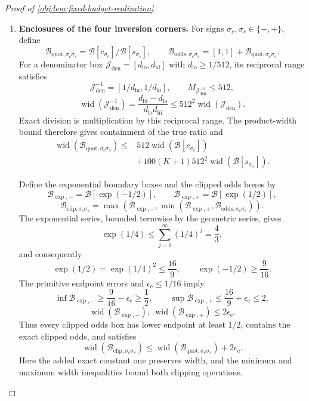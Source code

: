 \documentclass[11pt]{article}
\begin{document}
\begin{proof}[Proof of \cref{obj:lem:fixed-budget-realization}]
\begin{enumerate}
\item \textbf{Enclosures of the four inversion corners.}
For signs \(\sigma_c,\sigma_s\in\{-,+\}\), define
\[
\mathcal B_{\mathrm{quot},\sigma_c\sigma_s}
=\mathcal B[c_{\sigma_c}]/\mathcal B[s_{\sigma_s}],
\qquad
\mathcal B_{\mathrm{odds},\sigma_c\sigma_s}
=[1,1]+\mathcal B_{\mathrm{quot},\sigma_c\sigma_s}.
\]
For a denominator box
\(\mathcal J_{\mathrm{den}}=[d_{\mathrm{lo}},d_{\mathrm{hi}}]\)
with \(d_{\mathrm{lo}}\ge1/512\), its reciprocal range satisfies
\[
\mathcal J_{\mathrm{den}}^{-1}
=[1/d_{\mathrm{hi}},1/d_{\mathrm{lo}}],
\qquad
M_{\mathcal J_{\mathrm{den}}^{-1}}\le512,
\]
\[
\operatorname{wid}(\mathcal J_{\mathrm{den}}^{-1})
=
\frac{d_{\mathrm{hi}}-d_{\mathrm{lo}}}
     {d_{\mathrm{lo}}d_{\mathrm{hi}}}
\le512^2\operatorname{wid}(\mathcal J_{\mathrm{den}}).
\]
Exact division is multiplication by this reciprocal range. The product-width bound therefore gives containment of the true ratio and
\[
\begin{aligned}
\operatorname{wid}(\mathcal B_{\mathrm{quot},\sigma_c\sigma_s})
\le{}&
512\operatorname{wid}(\mathcal B[c_{\sigma_c}])\\
&+100(K+1)512^2
 \operatorname{wid}(\mathcal B[s_{\sigma_s}]).
\end{aligned}
\]

Define the exponential boundary boxes and the clipped odds boxes by
\[
\mathcal B_{\exp,-}=\mathcal B[\exp(-1/2)],
\qquad
\mathcal B_{\exp,+}=\mathcal B[\exp(1/2)],
\]
\[
\mathcal B_{\mathrm{clip},\sigma_c\sigma_s}
=
\max\left(
\mathcal B_{\exp,-},
\min\left(\mathcal B_{\exp,+},
          \mathcal B_{\mathrm{odds},\sigma_c\sigma_s}\right)
\right).
\]
The exponential series, bounded termwise by the geometric series, gives
\[
\exp(1/4)\le\sum_{j=0}^{\infty}(1/4)^j=\frac43,
\]
and consequently
\[
\exp(1/2)=\exp(1/4)^2\le\frac{16}{9},
\qquad
\exp(-1/2)\ge\frac9{16}.
\]
The primitive endpoint errors and \(\epsilon_{\mathrm e}\le1/16\) imply
\[
\inf\mathcal B_{\exp,-}\ge\frac9{16}-\epsilon_{\mathrm e}\ge\frac12,
\qquad
\sup\mathcal B_{\exp,+}\le\frac{16}{9}+\epsilon_{\mathrm e}\le2,
\]
\[
\operatorname{wid}(\mathcal B_{\exp,-}),
\ \operatorname{wid}(\mathcal B_{\exp,+})
\le2\epsilon_{\mathrm e}.
\]
Thus every clipped odds box has lower endpoint at least \(1/2\), contains the exact clipped odds, and satisfies
\[
\operatorname{wid}(\mathcal B_{\mathrm{clip},\sigma_c\sigma_s})
\le
\operatorname{wid}(\mathcal B_{\mathrm{quot},\sigma_c\sigma_s})
+2\epsilon_{\mathrm e}.
\]
Here the added exact constant one preserves width, and the minimum and maximum width inequalities bound both clipping operations.


\end{enumerate}
\end{proof}
\end{document}
